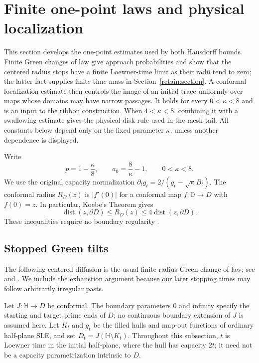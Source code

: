 \section{Finite one-point laws and physical localization}
\label{ll:section}

This section develops the one-point estimates used by both Hausdorff
bounds.  Finite Green changes of law give approach probabilities and
show that the centered radius stops have a finite Loewner-time limit as
their radii tend to zero; the latter fact supplies finite-time mass in
Section~\ref{retain:section}.  A conformal localization estimate then
controls the image of an initial trace uniformly over maps whose domains
may have narrow passages.  It holds for every $0<\kappa<8$ and is an
input to the ribbon construction.  When $4<\kappa<8$, combining it with
a swallowing estimate gives the physical-disk rule used in the mesh tail.
All constants below depend only on the fixed parameter $\kappa$, unless
another dependence is displayed.

Write
\[
 p=1-\frac\kappa8,\qquad a_0=\frac8\kappa-1,
 \qquad 0<\kappa<8.
\]
We use the original capacity normalization
$\partial_tg_t=2/(g_t-\sqrt\kappa B_t)$.
The conformal radius $R_D(z)$ is $|f'(0)|$ for a conformal map
$f:\mathbb D\to D$ with $f(0)=z$.
In particular, Koebe's Theorem gives
\begin{equation}
 \operatorname{dist}(z,\partial D)\le R_D(z)
 \le4\operatorname{dist}(z,\partial D).
 \label{ll:koebe}
\end{equation}
These inequalities require no boundary regularity
\cite[Section~3.2]{beliaev2015}.

\subsection{Stopped Green tilts}

The following centered diffusion is the usual finite-radius Green
change of law; see \cite[Section~2]{lawlerzhou2013} and
\cite[Sections~2.3--2.4]{lawlerwerness2013}.
We include the exhaustion argument because our later stopping times
may follow arbitrarily irregular pasts.

Let $J:\mathbb H\to D$ be conformal.  The boundary parameters $0$ and
infinity specify the starting and target prime ends of $D$; no continuous
boundary extension of $J$ is assumed here.  Let $K_t$ and $g_t$ be the
filled hulls and map-out functions of ordinary half-plane SLE, and set
$D_t=J(\mathbb H\setminus K_t)$.  Throughout this subsection, $t$ is
Loewner time in the initial half-plane, where the hull has capacity $2t$;
it need not be a capacity parametrization intrinsic to $D$.

